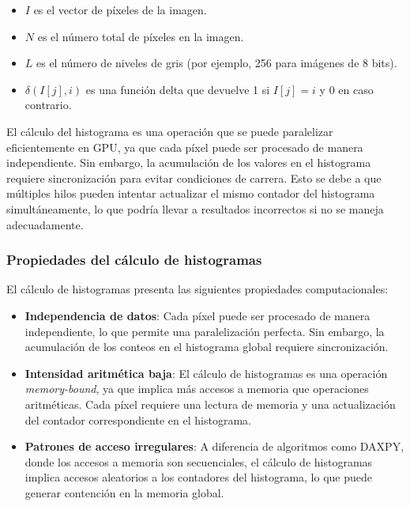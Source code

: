         \begin{itemize}
        
            \item \( I \) es el vector de píxeles de la imagen.
            
            \item \( N \) es el número total de píxeles en la imagen.
            
            \item \( L \) es el número de niveles de gris (por ejemplo, 256 para imágenes de 8 bits).
            
            \item \( \delta(I[j], i) \) es una función delta que devuelve 1 si \( I[j] = i \) y 0 en caso contrario.
            
        \end{itemize}

        El cálculo del histograma es una operación que se puede paralelizar eficientemente en GPU, ya que cada píxel puede ser procesado de manera independiente. Sin embargo, la acumulación de los valores en el histograma requiere sincronización para evitar condiciones de carrera. Esto se debe a que múltiples hilos pueden intentar actualizar el mismo contador del histograma simultáneamente, lo que podría llevar a resultados incorrectos si no se maneja adecuadamente.

        \subsubsection{Propiedades del cálculo de histogramas}

            El cálculo de histogramas presenta las siguientes propiedades computacionales:
            
            \begin{itemize}
            
                \item \textbf{Independencia de datos}: Cada píxel puede ser procesado de manera independiente, lo que permite una paralelización perfecta. Sin embargo, la acumulación de los conteos en el histograma global requiere sincronización.
                
                \item \textbf{Intensidad aritmética baja}: El cálculo de histogramas es una operación \textit{memory-bound}, ya que implica más accesos a memoria que operaciones aritméticas. Cada píxel requiere una lectura de memoria y una actualización del contador correspondiente en el histograma.
               
                \item \textbf{Patrones de acceso irregulares}: A diferencia de algoritmos como DAXPY, donde los accesos a memoria son secuenciales, el cálculo de histogramas implica accesos aleatorios a los contadores del histograma, lo que puede generar contención en la memoria global.
                
            \end{itemize}

